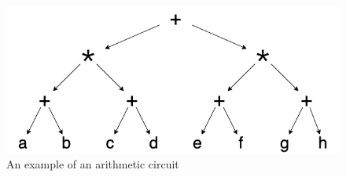 \begin{figure}
    \includegraphics[width=0.9\linewidth]{figures/compilation_overview/coyote_running_example.drawio.png}
    \caption{An example of an arithmetic circuit}\label{fig:example-circuit}
\end{figure}


